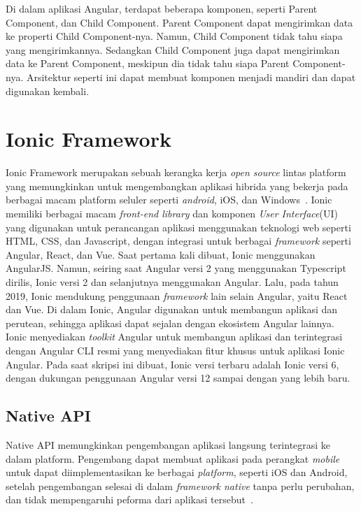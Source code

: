Di dalam aplikasi Angular, terdapat beberapa komponen, seperti Parent Component, dan Child Component. Parent Component dapat mengirimkan data ke properti Child Component-nya. Namun, Child Component tidak tahu siapa yang mengirimkannya. Sedangkan Child Component juga dapat mengirimkan data ke Parent Component, meskipun dia tidak tahu siapa Parent Component-nya. Arsitektur seperti ini dapat membuat komponen menjadi mandiri dan dapat digunakan kembali.

\section{Ionic Framework}
\label{sec:ionicframework} 
 
Ionic Framework merupakan sebuah kerangka kerja {\it open source} lintas platform yang memungkinkan untuk mengembangkan aplikasi hibrida yang bekerja pada berbagai macam platform seluler seperti {\it android}, iOS, dan Windows~\cite{waranashiwar:18:ionic}. Ionic memiliki berbagai macam \textit{front-end library} dan komponen \textit{User Interface}(UI) yang digunakan untuk  perancangan aplikasi menggunakan teknologi web seperti HTML, CSS, dan Javascript, dengan integrasi untuk berbagai \textit{framework} seperti Angular, React, dan Vue. Saat pertama kali dibuat, Ionic menggunakan AngularJS. Namun, seiring saat Angular versi 2 yang menggunakan Typescript dirilis, Ionic versi 2 dan selanjutnya menggunakan Angular. Lalu, pada tahun 2019, Ionic mendukung penggunaan \textit{framework} lain selain Angular, yaitu React dan Vue. Di dalam Ionic, Angular digunakan untuk membangun aplikasi dan perutean, sehingga aplikasi dapat sejalan dengan ekosistem Angular lainnya. Ionic menyediakan {\it toolkit} Angular untuk membangun aplikasi dan terintegrasi dengan Angular CLI resmi yang menyediakan fitur khusus untuk aplikasi Ionic Angular. Pada saat skripsi ini dibuat, Ionic versi terbaru adalah Ionic versi 6, dengan dukungan penggunaan Angular versi 12 sampai dengan yang lebih baru.  

\subsection{Native API}
\label{subsec:nativeApi}
Native API memungkinkan pengembangan aplikasi langsung terintegrasi ke dalam platform. Pengembang dapat membuat aplikasi pada perangkat {\it mobile} untuk dapat diimplementasikan ke berbagai {\it platform}, seperti iOS dan Android, setelah pengembangan selesai di dalam {\it framework native} tanpa perlu perubahan, dan tidak mempengaruhi peforma dari aplikasi tersebut~\cite{griffith:17:mobile}. 

